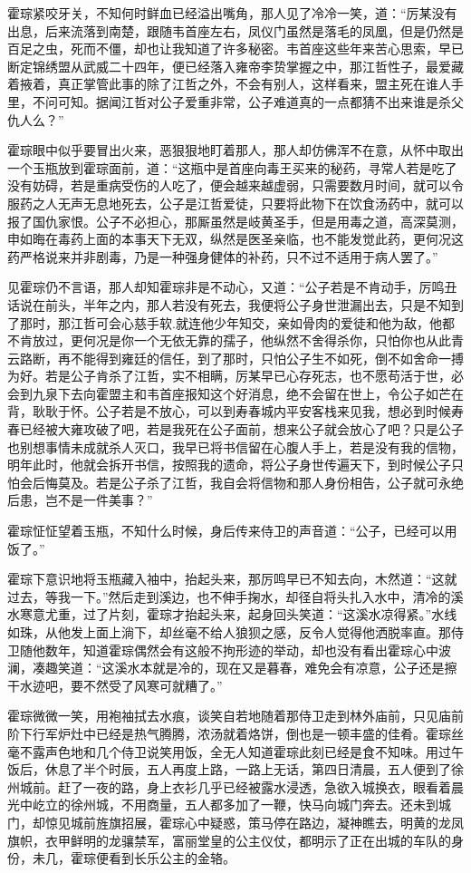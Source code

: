 霍琮紧咬牙关，不知何时鲜血已经溢出嘴角，那人见了冷冷一笑，道：“厉某没有出息，后来流落到南楚，跟随韦首座左右，凤仪门虽然是落毛的凤凰，但是仍然是百足之虫，死而不僵，却也让我知道了许多秘密。韦首座这些年来苦心思索，早已断定锦绣盟从武威二十四年，便已经落入雍帝李贽掌握之中，那江哲性子，最爱藏着掖着，真正掌管此事的除了江哲之外，不会有别人，这样看来，盟主死在谁人手里，不问可知。据闻江哲对公子爱重非常，公子难道真的一点都猜不出来谁是杀父仇人么？”

霍琮眼中似乎要冒出火来，恶狠狠地盯着那人，那人却仿佛浑不在意，从怀中取出一个玉瓶放到霍琮面前，道：“这瓶中是首座向毒王买来的秘药，寻常人若是吃了没有妨碍，若是重病受伤的人吃了，便会越来越虚弱，只需要数月时间，就可以令服药之人无声无息地死去，公子是江哲爱徒，只要将此物下在饮食汤药中，就可以报了国仇家恨。公子不必担心，那厮虽然是岐黄圣手，但是用毒之道，高深莫测，申如晦在毒药上面的本事天下无双，纵然是医圣亲临，也不能发觉此药，更何况这药严格说来并非剧毒，乃是一种强身健体的补药，只不过不适用于病人罢了。”

见霍琮仍不言语，那人却知霍琮非是不动心，又道：“公子若是不肯动手，厉鸣丑话说在前头，半年之内，那人若没有死去，我便将公子身世泄漏出去，只是不知到了那时，那江哲可会心慈手软.就连他少年知交，亲如骨肉的爱徒和他为敌，他都不肯放过，更何况是你一个无依无靠的孺子，他纵然不舍得杀你，只怕你也从此青云路断，再不能得到雍廷的信任，到了那时，只怕公子生不如死，倒不如舍命一搏为好。若是公子肯杀了江哲，实不相瞒，厉某早已心存死志，也不愿苟活于世，必会到九泉下去向霍盟主和韦首座报知这个好消息，绝不会留在世上，令公子如芒在背，耿耿于怀。公子若是不放心，可以到寿春城内平安客栈来见我，想必到时候寿春已经被大雍攻破了吧，若是我死在公子面前，想来公子就会放心了吧？只是公子也别想事情未成就杀人灭口，我早已将书信留在心腹人手上，若是没有我的信物，明年此时，他就会拆开书信，按照我的遗命，将公子身世传遍天下，到时候公子只怕会后悔莫及。若是公子杀了江哲，我自会将信物和那人身份相告，公子就可永绝后患，岂不是一件美事？”

霍琮怔怔望着玉瓶，不知什么时候，身后传来侍卫的声音道：“公子，已经可以用饭了。”

霍琮下意识地将玉瓶藏入袖中，抬起头来，那厉鸣早已不知去向，木然道：“这就过去，等我一下。”然后走到溪边，也不伸手掬水，却径自将头扎入水中，清冷的溪水寒意尤重，过了片刻，霍琮才抬起头来，起身回头笑道：“这溪水凉得紧。”水线如珠，从他发上面上淌下，却丝毫不给人狼狈之感，反令人觉得他洒脱率直。那侍卫随他数年，知道霍琮偶然会有这般不拘形迹的举动，却也没有看出霍琮心中波澜，凑趣笑道：“这溪水本就是冷的，现在又是暮春，难免会有凉意，公子还是擦干水迹吧，要不然受了风寒可就糟了。”

霍琮微微一笑，用袍袖拭去水痕，谈笑自若地随着那侍卫走到林外庙前，只见庙前阶下行军炉灶中已经是热气腾腾，浓汤就着烙饼，倒也是一顿丰盛的佳肴。霍琮丝毫不露声色地和几个侍卫说笑用饭，全无人知道霍琮此刻已经是食不知味。用过午饭后，休息了半个时辰，五人再度上路，一路上无话，第四日清晨，五人便到了徐州城前。赶了一夜的路，身上衣衫几乎已经被露水浸透，急欲入城换衣，眼看着晨光中屹立的徐州城，不用商量，五人都多加了一鞭，快马向城门奔去。还未到城门，却惊见城前旌旗招展，霍琮心中疑惑，策马停在路边，凝神瞧去，明黄的龙凤旗帜，衣甲鲜明的龙骧禁军，富丽堂皇的公主仪仗，都明示了正在出城的车队的身份，未几，霍琮便看到长乐公主的金辂。

